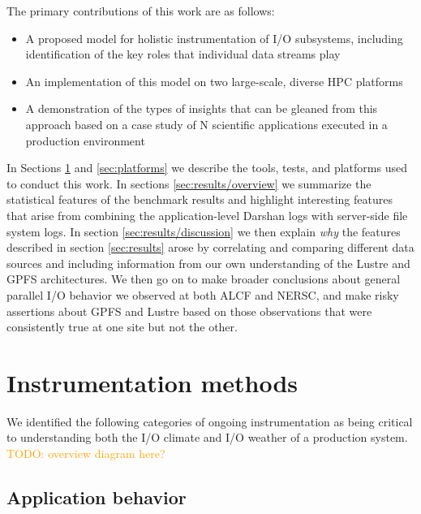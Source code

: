 \documentclass[conference,10pt,compsocconf]{IEEEtran}
\newcommand{\todo}[1]{\textcolor{Orange}{TODO: #1}}
\begin{document}

The primary contributions of this work are as follows:

\begin{itemize}
\item A proposed model for holistic instrumentation of I/O subsystems,
including identification of the key roles that individual data streams play
\item An implementation of this model on two large-scale, diverse HPC
platforms
\item A demonstration of the types of insights that can be gleaned from this
approach based on a case study of N scientific applications executed in a
production environment
\end{itemize}

In Sections \ref{sec:methods} and \ref{sec:platforms} we describe the tools, tests, and
platforms used to conduct this work.  In sections \ref{sec:results/overview} we summarize the
statistical features of the benchmark results and highlight interesting features
that arise from combining the application-level Darshan logs with server-side
file system logs.  In section \ref{sec:results/discussion} we then explain \emph{why} the
features described in section \ref{sec:results} arose by correlating and
comparing different data sources and including information from our own
understanding of the Lustre and GPFS architectures.  We then go on to make
broader conclusions about general parallel I/O behavior we observed at both
ALCF and NERSC, and make risky assertions about GPFS and Lustre based on those
observations that were consistently true at one site but not the other.

\section{Instrumentation methods} \label{sec:methods}

We identified the following categories of ongoing instrumentation as being
critical to understanding both the I/O climate and I/O weather of a
production system.  \todo{overview diagram here?}

\subsection{Application behavior}
\label{sec:methods/darshan}
\end{document}
